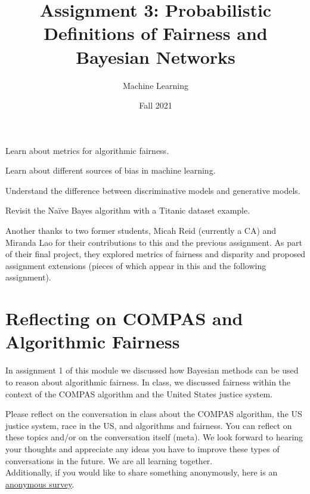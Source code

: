 \documentclass[assignment03_Solutions]{subfiles}
\title{Assignment 3: Probabilistic Definitions of Fairness and Bayesian Networks}
\author{Machine Learning}
\date{Fall 2021}
\begin{document}
\maketitle
\thispagestyle{firstpage}


\begin{learningobjectives}
\bi
\item Learn about metrics for algorithmic fairness.
\item Learn about different sources of bias in machine learning.
\item Understand the difference between discriminative models and generative models.
\item Revisit the Na\"ive Bayes algorithm with a Titanic dataset example.
\ei
\end{learningobjectives}

Another thanks to two former students, Micah Reid (currently a CA) and Miranda Lao for their contributions to this and the previous assignment. As part of their final project, they explored metrics of fairness and disparity and proposed assignment extensions (pieces of which appear in this and the following assignment). 

\section{Reflecting on COMPAS and Algorithmic Fairness}

In assignment 1 of this module we discussed how Bayesian methods can be used to reason about algorithmic fairness.  In class, we discussed fairness within the context of the COMPAS algorithm and the United States justice system.


\begin{exercise}[(15 minutes)]
Please reflect on the conversation in class about the COMPAS algorithm, the US justice system, race in the US, and algorithms and fairness. You can reflect on these topics and/or on the conversation itself (meta). We look forward to hearing your thoughts and appreciate any ideas you have to improve these types of conversations in the future. We are all learning together.\\

Additionally, if you would like to share something anonymously, here is an \href{https://docs.google.com/forms/d/e/1FAIpQLSf1NUDOQR6I0PcNyuaitbShR38pq5AgAiZnFnHtJCa28O-F4Q/viewform?usp=sf_link}{anonymous survey}.

\end{exercise}
\end{document}
